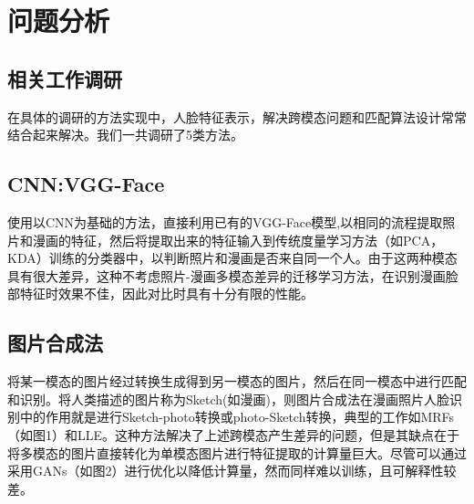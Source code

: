 \documentclass[12pt]{article}
\begin{document}
\begin{sloppypar}  %



 \vspace{0.5cm}  %
 
 \section{问题分析}  %
 	\begin{multicols*}{2}  %
 	

   
\section{相关工作调研}
在具体的调研的方法实现中，人脸特征表示，解决跨模态问题和匹配算法设计常常结合起来解决。我们一共调研了5类方法。

\subsection{CNN:VGG-Face}
使用以CNN为基础的方法，直接利用已有的VGG-Face模型,以相同的流程提取照片和漫画的特征，然后将提取出来的特征输入到传统度量学习方法（如PCA，KDA）训练的分类器中，以判断照片和漫画是否来自同一个人。由于这两种模态具有很大差异，这种不考虑照片-漫画多模态差异的迁移学习方法，在识别漫画脸部特征时效果不佳，因此对比时具有十分有限的性能。

\subsection{图片合成法}
将某一模态的图片经过转换生成得到另一模态的图片，然后在同一模态中进行匹配和识别。将人类描述的图片称为Sketch(如漫画)，则图片合成法在漫画照片人脸识别中的作用就是进行Sketch-photo转换或photo-Sketch转换，典型的工作如MRFs（如图1）和LLE。这种方法解决了上述跨模态产生差异的问题，但是其缺点在于将多模态的图片直接转化为单模态图片进行特征提取的计算量巨大。尽管可以通过采用GANs（如图2）进行优化以降低计算量，然而同样难以训练，且可解释性较差。



\end{multicols*}
\end{sloppypar}
\end{document}
